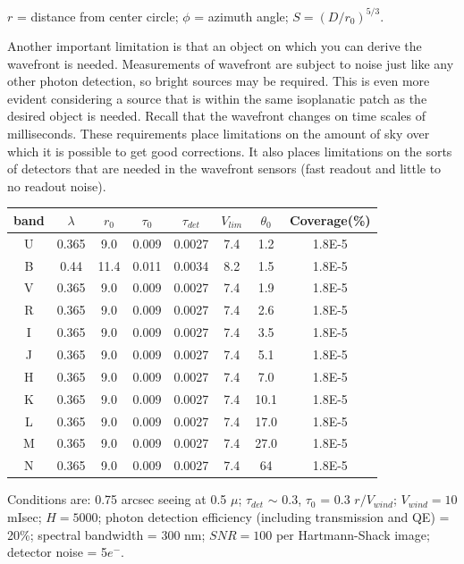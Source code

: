 \documentclass[12pt]{article}
\begin{document}
$r$ = distance from center circle;
$\phi$ = azimuth angle; $S=(D/r_0)^{5/3}$.

Another important limitation is that an object on which you
can derive the wavefront is needed. Measurements of wavefront are subject to
noise just like any other photon detection, so bright sources may be required.
This is even more evident considering a source that is within the same
isoplanatic patch as the desired object is needed.
Recall that the wavefront changes on time scales of milliseconds.
These requirements place limitations on the amount of
sky over which it is possible to get good corrections.
It also places limitations on the sorts of detectors that are needed
in the wavefront sensors (fast readout and little to no readout noise).

\begin{table}[th]
\centering
\begin{tabular}{c c c c c c c c}
    band & $\lambda$ & $r_0$ & $\tau_0$ & $\tau_{det}$ & $V_{lim}$ &
    $\theta_0$ & Coverage(\%)\\
    \hline\hline
    U & 0.365 & 9.0 & 0.009 & 0.0027 & 7.4 & 1.2 & 1.8E-5\\
    B & 0.44 & 11.4 & 0.011 & 0.0034 & 8.2 & 1.5 & 1.8E-5\\
    V & 0.365 & 9.0 & 0.009 & 0.0027 & 7.4 & 1.9 & 1.8E-5\\
    R & 0.365 & 9.0 & 0.009 & 0.0027 & 7.4 & 2.6 & 1.8E-5\\
    I & 0.365 & 9.0 & 0.009 & 0.0027 & 7.4 & 3.5 & 1.8E-5\\
    J & 0.365 & 9.0 & 0.009 & 0.0027 & 7.4 & 5.1 & 1.8E-5\\
    H & 0.365 & 9.0 & 0.009 & 0.0027 & 7.4 & 7.0 & 1.8E-5\\
    K & 0.365 & 9.0 & 0.009 & 0.0027 & 7.4 & 10.1 & 1.8E-5\\
    L & 0.365 & 9.0 & 0.009 & 0.0027 & 7.4 & 17.0 & 1.8E-5\\
    M & 0.365 & 9.0 & 0.009 & 0.0027 & 7.4 & 27.0 & 1.8E-5\\
    N & 0.365 & 9.0 & 0.009 & 0.0027 & 7.4 & 64 & 1.8E-5\\
    \hline
    \end{tabular}
\end{table}

Conditions are: 0.75 arcsec seeing at 0.5 $\mu$; $\tau_{det}$
$\sim$ 0.3, $\tau_0$ = 0.3 $r/V_{wind}$; $V_{wind}=10$ mIsec; $H=5000$;
photon detection efficiency (including transmission and QE) = 20\%;
spectral bandwidth = 300 nm; $SNR=100$ per Hartmann-Shack image;
detector noise = 5$e^{-}$.
\end{document}
